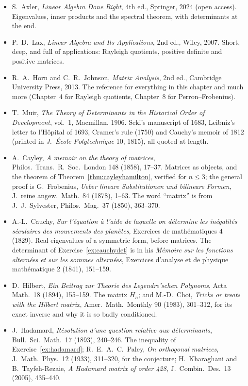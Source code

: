 \begin{itemize}
\item S.~Axler, \emph{Linear Algebra Done Right}, 4th ed., Springer, 2024 (open access). Eigenvalues, inner products and the spectral theorem, with determinants at the end.
\item P.~D.~Lax, \emph{Linear Algebra and Its Applications}, 2nd ed., Wiley, 2007. Short, deep, and full of applications: Rayleigh quotients, positive definite and positive matrices.
\item R.~A.~Horn and C.~R.~Johnson, \emph{Matrix Analysis}, 2nd ed., Cambridge University Press, 2013. The reference for everything in this chapter and much more (Chapter~4 for Rayleigh quotients, Chapter~8 for Perron--Frobenius).
\item T.~Muir, \emph{The Theory of Determinants in the Historical Order of Development}, vol.~1, Macmillan, 1906. Seki's manuscript of 1683, Leibniz's letter to l'H\^opital of 1693, Cramer's rule (1750) and Cauchy's memoir of 1812 (printed in \emph{J.\ \'Ecole Polytechnique} 10, 1815), all quoted at length.
\item A.~Cayley, \emph{A memoir on the theory of matrices}, Philos.\ Trans.\ R.\ Soc.\ London 148 (1858), 17--37. Matrices as objects, and the theorem of Theorem~\ref{thm:cayleyhamilton}, verified for $n\le3$; the general proof is G.~Frobenius, \emph{Ueber lineare Substitutionen und bilineare Formen}, J.\ reine angew.\ Math.\ 84 (1878), 1--63. The word ``matrix'' is from J.~J.~Sylvester, Philos.\ Mag.\ 37 (1850), 363--370.
\item A.-L.~Cauchy, \emph{Sur l'\'equation \`a l'aide de laquelle on d\'etermine les in\'egalit\'es s\'eculaires des mouvements des plan\`etes}, Exercices de math\'ematiques 4 (1829). Real eigenvalues of a symmetric form, before matrices. The determinant of Exercise~\ref{ex:cauchydet} is in his \emph{M\'emoire sur les fonctions altern\'ees et sur les sommes altern\'ees}, Exercices d'analyse et de physique math\'ematique 2 (1841), 151--159.
\item D.~Hilbert, \emph{Ein Beitrag zur Theorie des Legendre'schen Polynoms}, Acta Math.\ 18 (1894), 155--159. The matrix $H_n$; and M.-D.~Choi, \emph{Tricks or treats with the Hilbert matrix}, Amer.\ Math.\ Monthly 90 (1983), 301--312, for its exact inverse and why it is so badly conditioned.
\item J.~Hadamard, \emph{R\'esolution d'une question relative aux d\'eterminants}, Bull.\ Sci.\ Math.\ 17 (1893), 240--246. The inequality of Exercise~\ref{ex:hadamard}; R.~E.~A.~C.~Paley, \emph{On orthogonal matrices}, J.\ Math.\ Phys.\ 12 (1933), 311--320, for the conjecture; H.~Kharaghani and B.~Tayfeh-Rezaie, \emph{A Hadamard matrix of order 428}, J.\ Combin.\ Des.\ 13 (2005), 435--440.

\end{itemize}
